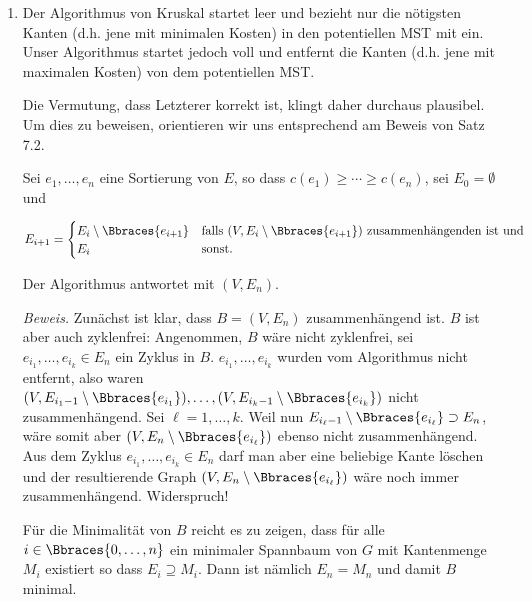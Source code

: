 \begin{solution}

\phantom{}

\begin{enumerate}[label = (\Alph*)]

    \item Der Algorithmus von Kruskal startet leer und bezieht nur die nötigsten Kanten (d.h. jene mit minimalen Kosten) in den potentiellen MST mit ein.
    Unser Algorithmus startet jedoch voll und entfernt die  Kanten (d.h. jene mit maximalen Kosten) von dem potentiellen MST.
    
    Die Vermutung, dass Letzterer korrekt ist, klingt daher durchaus plausibel.
    Um dies zu beweisen, orientieren wir uns entsprechend am Beweis von Satz 7.2.

    Sei $e_1, \dots, e_n$ eine Sortierung von $E$, so dass $c(e_1) \geq \cdots \geq c(e_n)$, sei $E_0 = \emptyset$ und

    \begin{align*}
        E_{i+1}
        =
        \begin{cases}
            E_i \setminus \Bbraces{e_{i+1}} & \text{falls}~ (V, E_i \setminus \Bbraces{e_{i+1}}) ~\text{zusammenhängenden ist und} \\
            E_i                             & \text{sonst.}
        \end{cases}
    \end{align*}

    Der Algorithmus antwortet mit $(V, E_n)$.

    \textit{Beweis.}
    Zunächst ist klar, dass $B = (V, E_n)$ zusammenhängend ist.
    $B$ ist aber auch zyklenfrei:
    Angenommen, $B$ wäre nicht zyklenfrei, sei $e_{i_1}, \dots, e_{i_k} \in E_n$ ein Zyklus in $B$.
    $e_{i_1}, \dots, e_{i_k}$ wurden vom Algorithmus nicht entfernt, also waren $(V, E_{i_1 - 1} \setminus \Bbraces{e_{i_1}}), \dots, (V, E_{i_k - 1} \setminus \Bbraces{e_{i_k}})$ nicht zusammenhängend.
    Sei $\ell = 1, \dots, k$.
    Weil nun $E_{i_\ell - 1} \setminus \Bbraces{e_{i_\ell}} \supset E_n$, wäre somit aber $(V, E_n \setminus \Bbraces{e_{i_\ell}})$ ebenso nicht zusammenhängend.
    Aus dem Zyklus $e_{i_1}, \dots, e_{i_k} \in E_n$ darf man aber eine beliebige Kante löschen und der resultierende Graph $(V, E_n \setminus \Bbraces{e_{i_\ell}})$ wäre noch immer zusammenhängend.
    Widerspruch!

    Für die Minimalität von $B$ reicht es zu zeigen, dass für alle $i \in \Bbraces{0, \dots, n}$ ein minimaler Spannbaum von $G$ mit Kantenmenge $M_i$ existiert so dass $E_i \supseteq M_i$.
    Dann ist nämlich $E_n = M_n$ und damit $B$ minimal.


\end{enumerate}
\end{solution}
